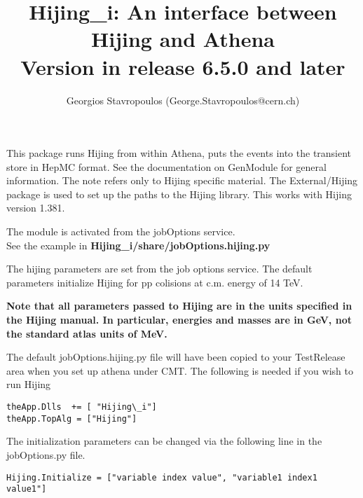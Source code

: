 \documentclass[11pt]{article}
\begin{document}
\title{Hijing\_i: An interface between Hijing and Athena\\
Version in release 6.5.0 and later}
\author{ Georgios Stavropoulos (George.Stavropoulos@cern.ch)}

\maketitle           

This package runs Hijing from within Athena, puts the events into the
transient store in HepMC format. See the documentation on GenModule  for
general information. The note refers only to Hijing specific
material. The External/Hijing package is used to set up the paths to
the Hijing library. This works with Hijing version 1.381.

The module is activated from the jobOptions service. \\See the example
in {\bf Hijing\_i/share/jobOptions.hijing.py }

The hijing parameters are set from the job options service. The
default parameters initialize Hijing for pp colisions at c.m. energy of 14 TeV.

{ \bf Note that all parameters passed to Hijing are in the units specified
in the Hijing manual. In particular, energies and masses are in GeV,
not the standard atlas units of MeV. }

The default jobOptions.hijing.py file will have been copied to your TestRelease
area when you set up athena under CMT.
The following is needed if you wish to run Hijing
\begin{verbatim}
theApp.Dlls  += [ "Hijing\_i"]
theApp.TopAlg = ["Hijing"]
\end{verbatim}
The initialization parameters can be changed via the following line in the jobOptions.py
file.

\begin{verbatim}Hijing.Initialize = ["variable index value", "variable1 index1 value1"]
\end{verbatim} 
\end{document}
